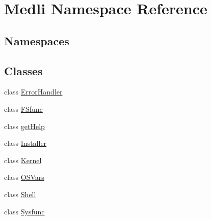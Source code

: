 \hypertarget{namespace_medli}{}\section{Medli Namespace Reference}
\label{namespace_medli}
\subsection*{Namespaces}
\begin{DoxyCompactItemize}
\end{DoxyCompactItemize}
\subsection*{Classes}
\begin{DoxyCompactItemize}
\item 
class \hyperlink{class_medli_1_1_error_handler}{Error\+Handler}
\item 
class \hyperlink{class_medli_1_1_f_sfunc}{F\+Sfunc}
\item 
class \hyperlink{class_medli_1_1get_help}{get\+Help}
\item 
class \hyperlink{class_medli_1_1_installer}{Installer}
\item 
class \hyperlink{class_medli_1_1_kernel}{Kernel}
\item 
class \hyperlink{class_medli_1_1_o_s_vars}{O\+S\+Vars}
\item 
class \hyperlink{class_medli_1_1_shell}{Shell}
\item 
class \hyperlink{class_medli_1_1_sysfunc}{Sysfunc}
\end{DoxyCompactItemize}
